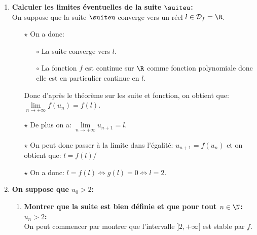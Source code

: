 \documentclass[a4paper, 11pt]{article}
\begin{document}
\begin{correction}
\begin{enumerate}
\item \textbf{Calculer les limites \'eventuelles de la suite $\suiteu$:}\\
\noindent On suppose que la suite $\suiteu$ converge vers un r\'eel $l\in\mathcal{D}_f=\R$.
\begin{itemize}
\item[$\star$] On a donc:
\begin{itemize}
\item[$\circ$] La suite converge vers $l$.
\item[$\circ$] La fonction $f$ est continue sur $\R$ comme fonction polynomiale donc elle est en particulier continue en $l$.
\end{itemize}
Donc d'apr\`{e}s le th\'eor\`{e}me sur les suite et fonction, on obtient que: $\lim\limits_{n\to +\infty} f(u_n)=f(l)$.
\item[$\star$] De plus on a: $\lim\limits_{n\to +\infty} u_{n+1}=l$.
\item[$\star$] On peut donc passer \`{a} la limite dans l'\'egalit\'e: $u_{n+1}=f(u_n)$ et on obtient que: $l=f(l)$/
\item[$\star$] On a donc: $l=f(l)\Leftrightarrow g(l)=0\Leftrightarrow l=2$. \\
\noindent {}
\end{itemize}
\item \textbf{On suppose que $u_0>2$:}
\begin{enumerate}
\item \textbf{Montrer que la suite est bien d\'efinie et que pour tout $n\in\N$: $u_n>2$:}\\
\noindent On peut commencer par montrer que l'intervalle $\rbrack 2,+\infty\lbrack$ est stable par $f$. 

\end{enumerate}
\end{enumerate}
\end{correction}
\end{document}
